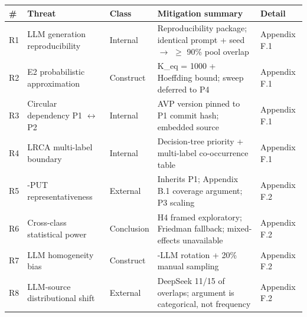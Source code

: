 \documentclass[review,12pt,authoryear]{elsarticle}
\newcounter{none}                   %
\begin{document}
{\def\LTcaptype{none} %
\begin{longtable}[]{@{}
  >{\raggedright\arraybackslash}p{}
  >{\raggedright\arraybackslash}p{}
  >{\raggedright\arraybackslash}p{}
  >{\raggedright\arraybackslash}p{}
  >{\raggedright\arraybackslash}p{}@{}}
\toprule\noalign{}
\begin{minipage}[b]{\linewidth}\raggedright
\#
\end{minipage} & \begin{minipage}[b]{\linewidth}\raggedright
Threat
\end{minipage} & \begin{minipage}[b]{\linewidth}\raggedright
Class
\end{minipage} & \begin{minipage}[b]{\linewidth}\raggedright
Mitigation summary
\end{minipage} & \begin{minipage}[b]{\linewidth}\raggedright
Detail
\end{minipage} \\
\midrule\noalign{}
\endhead
\bottomrule\noalign{}
\endlastfoot
R1 & LLM generation reproducibility & Internal & Reproducibility
package; identical prompt + seed $\to$ $\geq$ 90\% pool overlap & Appendix F.1 \\
R2 & E2 probabilistic approximation & Construct & K\_eq = 1000 +
Hoeffding bound; sweep deferred to P4 & Appendix F.1 \\
R3 & Circular dependency P1 $\leftrightarrow$ P2 & Internal & AVP version pinned to P1
commit hash; embedded source & Appendix F.1 \\
R4 & LRCA multi-label boundary & Internal & Decision-tree priority +
multi-label co-occurrence table & Appendix F.1 \\
R5 & 12-PUT representativeness & External & Inherits P1; Appendix B.1
coverage argument; P3 scaling & Appendix F.2 \\
R6 & Cross-class statistical power & Conclusion & H4 framed exploratory;
Friedman fallback; mixed-effects unavailable & Appendix F.2 \\
R7 & LLM homogeneity bias & Construct & 3-LLM rotation + 20\% manual
sampling & Appendix F.2 \\
R8 & LLM-source distributional shift & External & DeepSeek 11/15 of
overlaps; argument is categorical, not frequency & Appendix F.2 \\

\end{longtable}}
\end{document}
